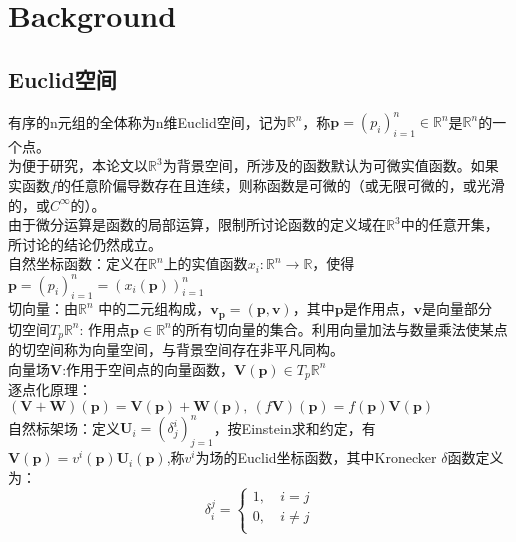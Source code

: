 \documentclass[UTF8]{article}
\begin{document}
\section{Background}
\subsection{Euclid空间}
有序的n元组的全体称为n维Euclid空间，记为$\mathbb R^n$，称$\boldsymbol p=(p_i)_{i=1}^n \in \mathbb R^n$是$\mathbb R^n$的一个点。\\
为便于研究，本论文以$ \mathbb R^3$为背景空间，所涉及的函数默认为可微实值函数。如果实函数$f$的任意阶偏导数存在且连续，则称函数是可微的（或无限可微的，或光滑的，或$C^\infty$的）。\\
由于微分运算是函数的局部运算，限制所讨论函数的定义域在$ \mathbb R^3$中的任意开集，所讨论的结论仍然成立。\\
自然坐标函数：定义在$\mathbb R^n$上的实值函数$x_i: \mathbb R^n \to  \mathbb R$，使得$\boldsymbol p=(p_i)_{i=1}^n = \left( x_i(\boldsymbol p) \right)_{i=1}^n   $\\
切向量：由$\mathbb R^n$ 中的二元组构成，$\boldsymbol v_{\boldsymbol p}=(\boldsymbol p,\boldsymbol v)$，其中$\boldsymbol p$是作用点，$\boldsymbol v$是向量部分\\
切空间$T_p  \mathbb R^n$: 作用点$\boldsymbol p \in \mathbb R^n$的所有切向量的集合。利用向量加法与数量乘法使某点的切空间称为向量空间，与背景空间存在非平凡同构。\\
向量场$\boldsymbol V$:作用于空间点的向量函数，$\boldsymbol V(\boldsymbol p)\in T_p  \mathbb R^n $\\
逐点化原理：$(\boldsymbol V+\boldsymbol W)(\boldsymbol p)=\boldsymbol V(\boldsymbol p)+\boldsymbol W(\boldsymbol p),\ (f \boldsymbol V)(\boldsymbol p)= f(\boldsymbol p)\boldsymbol V (\boldsymbol p)$\\
自然标架场：定义$\boldsymbol U_i=(\delta _j^i)_{j=1}^n$，按Einstein求和约定，有$\boldsymbol V(\boldsymbol p)=v^i(\boldsymbol p)\boldsymbol U_i(\boldsymbol p)$,称$v^i$为场的Euclid坐标函数，其中Kronecker $\delta$函数定义为：
\begin{equation}
\label{Kronecker_delta}
\delta _i^j=\left\{ 
    \begin{aligned}
    1,\  & i =j\\
    0,\  & i \neq j\\
    \end{aligned}
     \right.
\end{equation}
 
\end{document}
